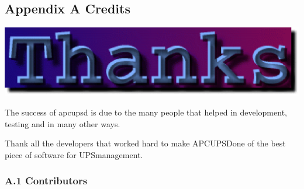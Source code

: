 \label{Credits-_003c1_003e}

\subsection*{Appendix A Credits}

\includegraphics{./thanks.eps}  

The success of apcupsd is due to the many people that helped in development,
testing and in many other ways.  

Thank all the developers that worked hard to make APCUPSDone of the best piece
of software for UPSmanagement. 

\label{Contributors}

\subsubsection*{A.1 Contributors}


